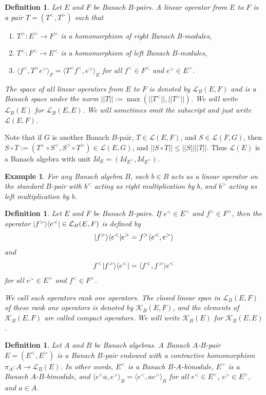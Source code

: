 \documentclass[a4,11pt]{amsart}
\newtheorem{ex}[thm]{Example}
\newtheorem{defn}[thm]{Definition}
\theoremstyle{remark}
\DeclarePairedDelimiter\bra{\langle}{\rvert}
\DeclarePairedDelimiter\ket{\lvert}{\rangle}
\begin{document}
\begin{defn}
Let $E$ and $F$ be Banach $B$-pairs. A linear operator from $E$ to $F$ is a pair $T=(T^<,T^>)$ such that 
\begin{enumerate}
\item $T^>:E^>\rightarrow F^>$ is a homomorphism of right Banach B-modules,
\item $T^<:F^<\rightarrow E^<$ is a homomorphism of left Banach $B$-modules,
\item $\langle f^<,T^>e^> \rangle_F=\langle T^<f^<,e^> \rangle_E$ for all $f^<\in F^<$ and $e^>\in E^>$.
\end{enumerate}

The space of all linear operators from $E$ to $F$ is denoted by $\mathcal{L}_B(E,F)$ and is a Banach space under the norm $||T||:=\max(||T^<||,||T^>||)$. We will write $\mathcal{L}_B(E)$ for $\mathcal{L}_B(E,E)$. We will sometimes omit the subscript and just write $\mathcal{L}(E,F)$.
\end{defn}

Note that if $G$ is another Banach $B$-pair, $T\in\mathcal{L}(E,F)$, and $S\in\mathcal{L}(F,G)$, then $S\circ T:=(T^<\circ S^<,S^>\circ T^>)\in\mathcal{L}(E,G)$, and $||S\circ T||\leq ||S|| ||T||$. Thus $\mathcal{L}(E)$ is a Banach algebra with unit $Id_E=(Id_{E^<},Id_{E^>})$.

\begin{ex}
For any Banach algebra $B$, each $b\in B$ acts as a linear operator on the standard $B$-pair with $b^<$ acting as right multiplication by $b$, and $b^>$ acting as left multiplication by $b$.
\end{ex}

\begin{defn}
Let $E$ and $F$ be Banach $B$-pairs. If $e^<\in E^<$ and $f^>\in F^>$, then the operator $\ket{f^>}\bra{e^<}\in\mathcal{L}_B(E,F)$ is defined by \[\ket{f^>}\bra{e^<}e^>=f^>\langle e^<,e^> \rangle\] and \[f^<\ket{f^>}\bra{e^<}=\langle f^<,f^> \rangle e^<\] for all $e^>\in E^>$ and $f^<\in F^<$.

We call such operators rank one operators. The closed linear span in $\mathcal{L}_B(E,F)$ of these rank one operators is denoted by $\mathcal{K}_B(E,F)$, and the elements of $\mathcal{K}_B(E,F)$ are called compact operators. We will write $\mathcal{K}_B(E)$ for $\mathcal{K}_B(E,E)$.
\end{defn}

\begin{defn}
Let $A$ and $B$ be Banach algebras. A Banach $A$-$B$-pair $E=(E^<,E^>)$ is a Banach $B$-pair endowed with a contractive homomorphism $\pi_A:A\rightarrow\mathcal{L}_B(E)$. In other words, $E^<$ is a Banach $B$-$A$-bimodule, $E^>$ is a Banach $A$-$B$-bimodule, and $\langle e^<a,e^> \rangle_B=\langle e^<,ae^> \rangle_B$ for all $e^<\in E^<$, $e^>\in E^>$, and $a\in A$.
\end{defn}
\end{document}
